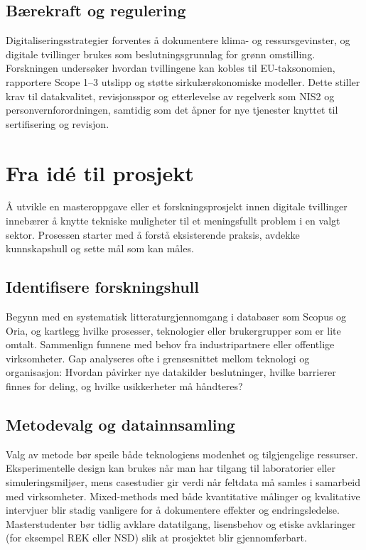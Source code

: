 \subsection{Bærekraft og regulering}
Digitaliseringsstrategier forventes å dokumentere klima- og ressursgevinster, og digitale tvillinger brukes som beslutningsgrunnlag for grønn omstilling. Forskningen undersøker hvordan tvillingene kan kobles til EU-taksonomien, rapportere Scope 1–3 utslipp og støtte sirkulærøkonomiske modeller. Dette stiller krav til datakvalitet, revisjonsspor og etterlevelse av regelverk som NIS2 og personvernforordningen, samtidig som det åpner for nye tjenester knyttet til sertifisering og revisjon.

\section{Fra idé til prosjekt}
Å utvikle en masteroppgave eller et forskningsprosjekt innen digitale tvillinger innebærer å knytte tekniske muligheter til et meningsfullt problem i en valgt sektor. Prosessen starter med å forstå eksisterende praksis, avdekke kunnskapshull og sette mål som kan måles.

\subsection{Identifisere forskningshull}
Begynn med en systematisk litteraturgjennomgang i databaser som Scopus og Oria, og kartlegg hvilke prosesser, teknologier eller brukergrupper som er lite omtalt. Sammenlign funnene med behov fra industripartnere eller offentlige virksomheter. Gap analyseres ofte i grensesnittet mellom teknologi og organisasjon: Hvordan påvirker nye datakilder beslutninger, hvilke barrierer finnes for deling, og hvilke usikkerheter må håndteres?

\subsection{Metodevalg og datainnsamling}
Valg av metode bør speile både teknologiens modenhet og tilgjengelige ressurser. Eksperimentelle design kan brukes når man har tilgang til laboratorier eller simuleringsmiljøer, mens casestudier gir verdi når feltdata må samles i samarbeid med virksomheter. Mixed-methods med både kvantitative målinger og kvalitative intervjuer blir stadig vanligere for å dokumentere effekter og endringsledelse. Masterstudenter bør tidlig avklare datatilgang, lisensbehov og etiske avklaringer (for eksempel REK eller NSD) slik at prosjektet blir gjennomførbart.

